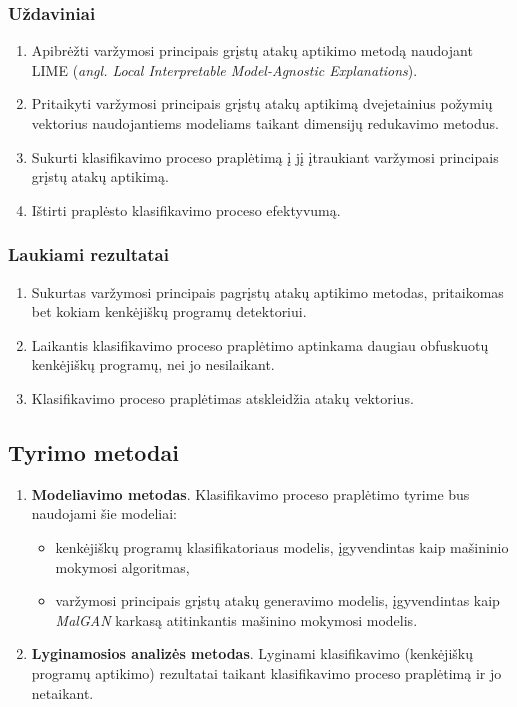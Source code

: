 \subsubsection{Uždaviniai}
\begin{enumerate}
    \item Apibrėžti varžymosi principais grįstų atakų aptikimo metodą naudojant LIME (\textit{angl. Local Interpretable Model-Agnostic Explanations}).
    \item Pritaikyti varžymosi principais grįstų atakų aptikimą dvejetainius požymių vektorius naudojantiems modeliams taikant dimensijų redukavimo metodus.
    \item Sukurti klasifikavimo proceso praplėtimą į jį įtraukiant varžymosi principais
          grįstų atakų aptikimą.
    \item Ištirti praplėsto klasifikavimo proceso efektyvumą.
\end{enumerate}

\subsubsection{Laukiami rezultatai}
\begin{enumerate}
    \item Sukurtas varžymosi principais pagrįstų atakų aptikimo metodas, pritaikomas bet kokiam kenkėjiškų programų detektoriui.
    \item Laikantis klasifikavimo proceso praplėtimo aptinkama daugiau obfuskuotų kenkėjiškų programų, nei jo nesilaikant.
    \item Klasifikavimo proceso praplėtimas atskleidžia atakų vektorius.
\end{enumerate}

\subsection{Tyrimo metodai}

\begin{enumerate}
    \item \textbf{Modeliavimo metodas}. Klasifikavimo proceso praplėtimo tyrime bus naudojami šie modeliai:
    \begin{itemize}
        \item kenkėjiškų programų klasifikatoriaus modelis, įgyvendintas kaip mašininio mokymosi algoritmas,
        \item varžymosi principais grįstų atakų generavimo modelis, įgyvendintas kaip \textit{MalGAN} karkasą atitinkantis mašinino mokymosi modelis.
    \end{itemize}
    \item \textbf{Lyginamosios analizės metodas}. Lyginami klasifikavimo (kenkėjiškų programų aptikimo) rezultatai taikant klasifikavimo proceso praplėtimą ir jo netaikant.
\end{enumerate}

